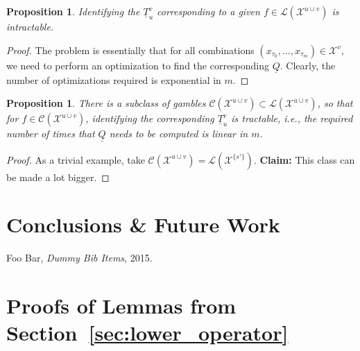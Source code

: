\documentclass[10pt]{paper}
\newtheorem{proposition}[theorem]{Proposition}
\newcommand{\states}{\mathcal{X}}
\newcommand{\lt}{\underline{T}}
\newcommand{\gambles}{\mathcal{L}}
\newcommand{\lrate}{\underline{Q}}
\begin{document}
\begin{proposition}
Identifying the $\lt_u^v$ corresponding to a given $f\in\gambles(\states^{u\cup v})$ is intractable.
\end{proposition}
\begin{proof}
The problem is essentially that for all combinations $(x_{\tau_0},\ldots,x_{\tau_m})\in\states^v$, we need to perform an optimization to find the corresponding $\lrate$. Clearly, the number of optimizations required is exponential in $m$.
\end{proof}

\begin{proposition}
There is a subclass of gambles $\mathcal{C}(\states^{u\cup v})\subset\gambles(\states^{u\cup v})$, so that for $f\in\mathcal{C}(\states^{u\cup v})$, identifying the corresponding $\lt_u^v$ is tractable, i.e., the required number of times that $\lrate$ needs to be computed is linear in $m$.
\end{proposition}
\begin{proof}
As a trivial example, take $\mathcal{C}(\states^{u\cup v}) = \gambles(\states^{\{s'\}})$. {\bf Claim: } This class can be made a lot bigger.
\end{proof}


\section{Conclusions \& Future Work}\label{sec:conclusions}

\begin{thebibliography}{99}
	Foo Bar, \emph{Dummy Bib Items}, 2015.

\end{thebibliography}

\appendix

\section{Proofs of Lemmas from Section~\ref{sec:lower_operator}}
\end{document}
